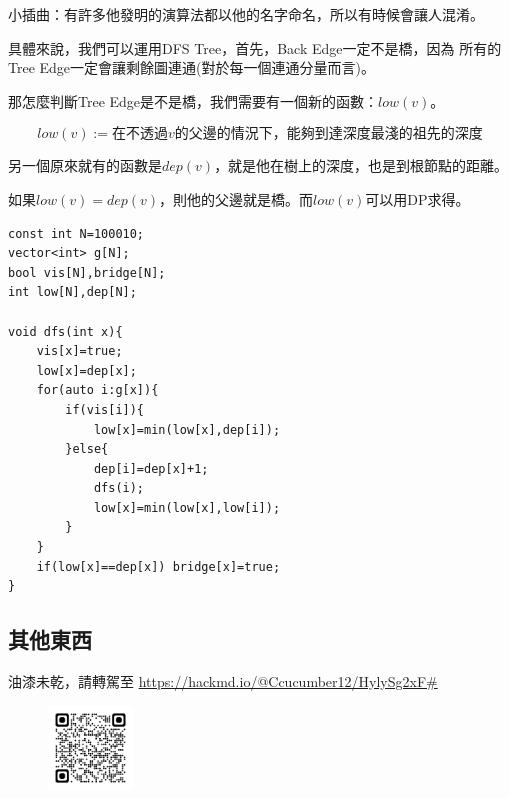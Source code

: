     小插曲：有許多他發明的演算法都以他的名字命名，所以有時候會讓人混淆。

    具體來說，我們可以運用DFS Tree，首先，Back Edge一定不是橋，因為
    所有的Tree Edge一定會讓剩餘圖連通(對於每一個連通分量而言)。

    那怎麼判斷Tree Edge是不是橋，我們需要有一個新的函數：$low(v)$。

    $$low(v) := 在不透過v的父邊的情況下，能夠到達深度最淺的祖先的深度$$

    另一個原來就有的函數是$dep(v)$，就是他在樹上的深度，也是到根節點的距離。

    如果$low(v)=dep(v)$，則他的父邊就是橋。而$low(v)$可以用DP求得。

\begin{lstlisting}[caption=邊雙連通]
const int N=100010;
vector<int> g[N];
bool vis[N],bridge[N];
int low[N],dep[N];
 
void dfs(int x){
    vis[x]=true;
    low[x]=dep[x];
    for(auto i:g[x]){
        if(vis[i]){
            low[x]=min(low[x],dep[i]);
        }else{
            dep[i]=dep[x]+1;
            dfs(i);
            low[x]=min(low[x],low[i]);
        }
    }
    if(low[x]==dep[x]) bridge[x]=true;
}
\end{lstlisting}

    \subsection{其他東西}
    油漆未乾，請轉駕至 \url{https://hackmd.io/@Ccucumber12/HylySg2xF#}

    \begin{figure}[!htbp]
        \centering
        \includegraphics[width=0.2\textwidth]{../Images/AT4.png}
    \end{figure}